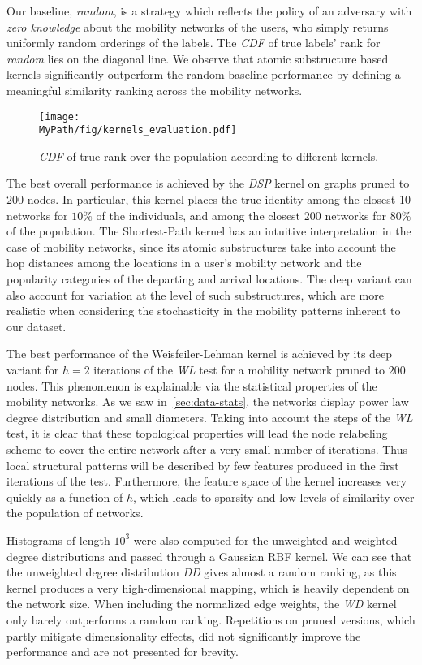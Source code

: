 Our baseline, \emph{random}, is a strategy which reflects the policy of an adversary with \emph{zero knowledge} about the mobility networks of the users, who simply returns uniformly random orderings of the labels.
The \emph{CDF} of true labels' rank for \emph{random} lies on the diagonal line.
We observe that atomic substructure based kernels significantly outperform the random baseline performance by defining a meaningful similarity ranking across the mobility networks.

\begin{figure}[!t]
	\centering
	\texttt{[image: \\MyPath/fig/kernels\_evaluation.pdf]}
	\caption{\emph{CDF} of true rank over the population according to different kernels.}
	\label{fig:kernels_evaluation}
\end{figure}

The best overall performance is achieved by the \emph{DSP} kernel on graphs pruned to $ 200 $ nodes.
In particular, this kernel places the true identity among the closest 10 networks for $10\%$ of the individuals, and among the closest $ 200 $ networks for $ 80\%$ of the population.
The Shortest-Path kernel has an intuitive interpretation in the case of mobility networks, since its atomic substructures take into account the hop distances among the locations in a user's mobility network and the popularity categories of the departing and arrival locations.
The deep variant can also account for variation at the level of such substructures, which are more realistic when considering the stochasticity in the mobility patterns inherent to our dataset.

The best performance of the Weisfeiler-Lehman kernel is achieved by its deep variant for $ h=2 $ iterations of the \emph{WL} test for a mobility network pruned to $200$ nodes.
This phenomenon is explainable via the statistical properties of the mobility networks.
As we saw in~\cref{sec:data-stats}, the networks display power law degree distribution and small diameters.
Taking into account the steps of the \emph{WL} test, it is clear that these topological properties will lead the node relabeling scheme to cover the entire network after a very small number of iterations.
Thus local structural patterns will be described by few features produced in the first iterations of the test.
Furthermore, the feature space of the kernel increases very quickly as a function of $ h $, which leads to sparsity and low levels of similarity over the population of networks.

Histograms of length $10^3$ were also computed for the unweighted and weighted degree distributions and passed through a Gaussian RBF kernel.
We can see that the unweighted degree distribution \emph{DD} gives almost a random ranking, as this kernel produces a very high-dimensional mapping, which is heavily dependent on the network size. When including the normalized edge weights, the \emph{WD} kernel only barely outperforms a random ranking.
Repetitions on pruned versions, which partly mitigate dimensionality effects, did not significantly improve the performance and are not presented for brevity.

